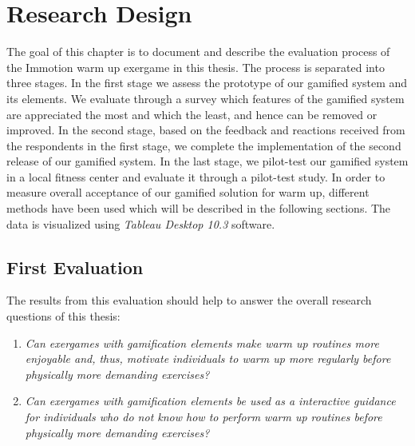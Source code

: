 \chapter{Research Design}\label{chapter:survey_one}

The goal of this chapter is to document and describe the evaluation process of the Immotion warm up exergame in this thesis. The process is separated into three stages. In the first stage we assess the prototype of our gamified system and its elements. We evaluate through a survey which features of the gamified system are appreciated the most and which the least, and hence can be removed or improved. In the second stage, based on the feedback and reactions received from the respondents in the first stage, we complete the implementation of the second release of our gamified system. In the last stage, we pilot-test our gamified system in a local fitness center and evaluate it through a pilot-test study. In order to measure overall acceptance of our gamified solution for warm up, different methods have been used which will be described in the following sections.  The data is visualized using \textit{Tableau Desktop 10.3} software.

\section{First Evaluation}

The results from this evaluation should help to answer the overall research questions of this thesis:
\begin{enumerate}
\item \textit{Can exergames with gamification elements make warm up routines more enjoyable and, thus, motivate individuals to warm up more regularly before physically more demanding exercises?}
\item \textit{Can exergames with gamification elements be used as a interactive guidance for individuals who do not know how to perform warm up routines before physically more demanding exercises?}
\end{enumerate}

